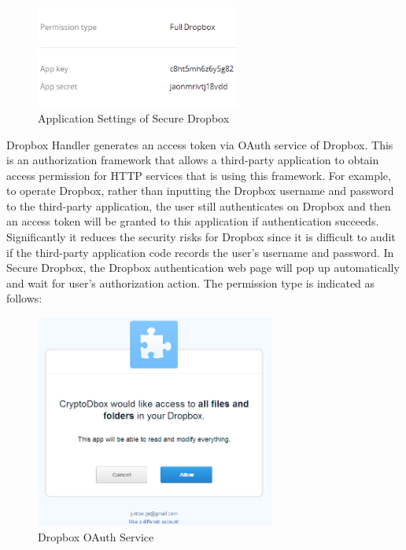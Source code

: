 \begin{figure}[h]
        \centering
        \includegraphics[width=0.6\textwidth]{figures/Application_Settings_of_Secure_Dropbox.png}
        \caption[Application Settings of Secure Dropbox] {Application Settings of Secure Dropbox}
\end{figure}

Dropbox Handler generates an access token via OAuth service of Dropbox. This is an authorization framework that allows a third-party application to obtain access permission for HTTP services that is using this framework. For example, to operate Dropbox, rather than inputting the Dropbox username and password to the third-party application, the user still authenticates on Dropbox and then an access token will be granted to this application if authentication succeeds. Significantly it reduces the security risks for Dropbox since it is difficult to audit if the third-party application code records the user’s username and password. In Secure Dropbox, the Dropbox authentication web page will pop up automatically and wait for user’s authorization action. The permission type is indicated as follows:

\begin{figure}[!h]
        \centering
        \includegraphics[width=0.7\textwidth]{figures/Dropbox_OAuth_Service.png}
        \caption[Dropbox OAuth Service] {Dropbox OAuth Service}
\end{figure}

